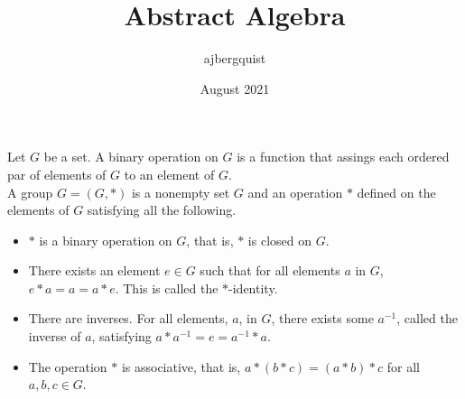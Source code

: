 \documentclass{article}
\title{Abstract Algebra}
\author{ajbergquist }
\date{August 2021}
\theoremstyle{definition}
\begin{document}
 Let $G$ be a set. A binary operation on $G$ is a function that assings each ordered par of elements of $G$ to an element of $G$.\\

 A group $G = (G,*)$ is a nonempty set $G$ and an operation $*$ defined on the elements of $G$ satisfying all the following.
\begin{itemize}
    \item $*$ is a binary operation on $G$, that is, $*$ is closed on $G$.
    \item There exists an element $e\in G$ such that for all elements $a$ in $G$, $e*a = a = a*e$. This is called the $*$-identity.
    \item There are inverses. For all elements, $a$, in $G$, there exists some $a^{-1}$, called the inverse of $a$, satisfying $a*a^{-1} = e = a^{-1}*a$.
    \item The operation $*$ is associative, that is, $a*(b*c) = (a*b)*c$ for all $a,b,c\in G$.
\end{itemize}\\
\end{document}
